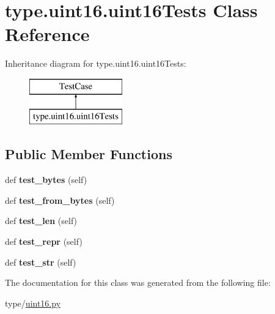\hypertarget{classtype_1_1uint16_1_1uint16Tests}{}\section{type.\+uint16.\+uint16\+Tests Class Reference}
\label{classtype_1_1uint16_1_1uint16Tests}
Inheritance diagram for type.\+uint16.\+uint16\+Tests\+:\begin{figure}[H]
\begin{center}
\leavevmode
\includegraphics[height=2.000000cm]{classtype_1_1uint16_1_1uint16Tests}
\end{center}
\end{figure}
\subsection*{Public Member Functions}
\begin{DoxyCompactItemize}
\item 
\mbox{\label{classtype_1_1uint16_1_1uint16Tests_a813065c65abe070322d4c32ab84fbe7f}} 
def {\bfseries test\+\_\+bytes} (self)
\item 
\mbox{\label{classtype_1_1uint16_1_1uint16Tests_ae2ca5b9c30f8f2d2e36d0845f477f093}} 
def {\bfseries test\+\_\+from\+\_\+bytes} (self)
\item 
\mbox{\label{classtype_1_1uint16_1_1uint16Tests_a4ac6155ba4d0a0679314d6fadd9d8d0a}} 
def {\bfseries test\+\_\+len} (self)
\item 
\mbox{\label{classtype_1_1uint16_1_1uint16Tests_a52d08b1e528f45e36e7bb34162204cae}} 
def {\bfseries test\+\_\+repr} (self)
\item 
\mbox{\label{classtype_1_1uint16_1_1uint16Tests_a3d7fb890163757da78c248428a75b104}} 
def {\bfseries test\+\_\+str} (self)
\end{DoxyCompactItemize}


The documentation for this class was generated from the following file\+:\begin{DoxyCompactItemize}
\item 
type/\mbox{\hyperlink{uint16_8py}{uint16.\+py}}\end{DoxyCompactItemize}
